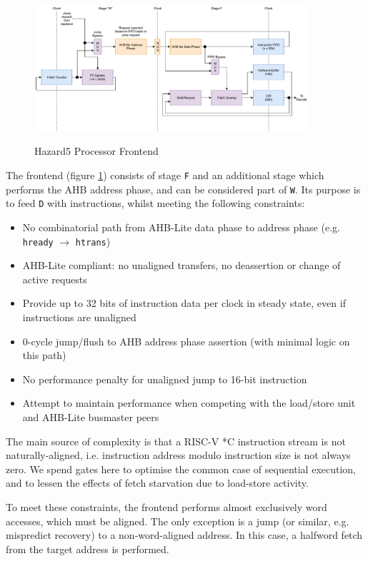 \documentclass[notitlepage]{article}
\begin{document}
\begin{figure}[!htb]
\centering
\caption{Hazard5 Processor Frontend}
\includegraphics[width=0.9\textwidth]{diagrams/cpu_frontend.pdf}
\label{diagram:frontend}
\end{figure}

The frontend (figure \ref{diagram:frontend}) consists of stage \texttt{F} and an additional stage which performs the AHB address phase, and can be considered part of \texttt{W}. Its purpose is to feed \texttt{D} with instructions, whilst meeting the following constraints:

\begin{itemize}
	\item No combinatorial path from AHB-Lite data phase to address phase (e.g. \texttt{hready} $\to$ \texttt{htrans})
	\item AHB-Lite compliant: no unaligned transfers, no deassertion or change of active requests
	\item Provide up to 32 bits of instruction data per clock in steady state, even if instructions are unaligned
	\item 0-cycle jump/flush to AHB address phase assertion (with minimal logic on this path)
	\item No performance penalty for unaligned jump to 16-bit instruction
	\item Attempt to maintain performance when competing with the load/store unit and AHB-Lite busmaster peers
\end{itemize}

The main source of complexity is that a RISC-V *C instruction stream is not naturally-aligned, i.e. instruction address modulo instruction size is not always zero. We spend gates here to optimise the common case of sequential execution, and to lessen the effects of fetch starvation due to load-store activity.

To meet these constraints, the frontend performs almost exclusively word accesses, which must be aligned. The only exception is a jump (or similar, e.g. mispredict recovery) to a non-word-aligned address. In this case, a halfword fetch from the target address is performed.
\end{document}
